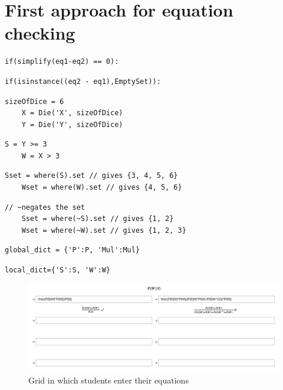 \chapter{First approach for equation checking}
\begin{lstlisting}[captionpos=b, caption=Comparing two equations, label={equationcheck}]
    if(simplify(eq1-eq2) == 0):
\end{lstlisting}
\begin{lstlisting}[captionpos=b, caption=Sympy Comparing Two Sets, label={checkforemptyset}]
    if(isinstance((eq2 - eq1),EmptySet)):
\end{lstlisting}
\begin{lstlisting}[captionpos=b, caption=Creating a random symbol in Sympy, frame=single, label={randomsymbol}]
    sizeOfDice = 6
    X = Die('X', sizeOfDice)
    Y = Die('Y', sizeOfDice)
\end{lstlisting}
\begin{lstlisting}[captionpos=b, caption=Creating a finite random variable in Sympy, frame=single, label={finiterandomvariable}]
    S = Y >= 3
    W = X > 3
\end{lstlisting}
\begin{lstlisting}[captionpos=b, caption=Transforming a finite random variable into a set, frame=single, label={wherefunction}]
    Sset = where(S).set // gives {3, 4, 5, 6}
    Wset = where(W).set // gives {4, 5, 6}
\end{lstlisting}
\begin{lstlisting}[captionpos=b, caption=Transforming a finite random variable into a set, frame=single, label={negationofset}]
    // ~negates the set
    Sset = where(~S).set // gives {1, 2}
    Wset = where(~W).set // gives {1, 2, 3}
\end{lstlisting}
\begin{lstlisting}[captionpos=b, caption=A global dictionary in Sympy, frame=single, label={globaldict}]
    global_dict = {'P':P, 'Mul':Mul}
\end{lstlisting}
\begin{lstlisting}[captionpos=b, caption=A local dictionary in Sympy, frame=single, label={localdict}]
    local_dict={'S':S, 'W':W}
\end{lstlisting}
\begin{figure}[h]
    \begin{center}
        \includegraphics[scale=0.2]{./images/GridWithCorrection.jpg}
    \end{center}
    \caption{Grid in which students enter their equations}\label{fig:GridWithSolution}
\end{figure}
